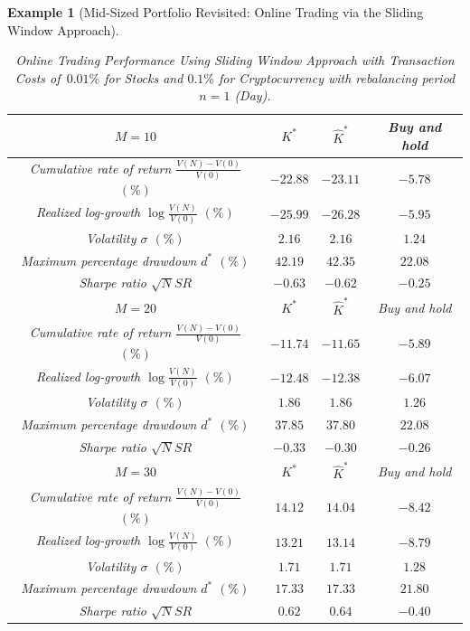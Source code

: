 \documentclass[10pt]{article} %
\newtheorem{example}{Example}[section]
\begin{document}
\begin{example}[Mid-Sized Portfolio Revisited: Online Trading via the Sliding Window Approach]
		\begin{table}[h!] 
			\centering
			\caption{Online Trading Performance Using Sliding Window Approach with Transaction Costs of~$0.01\%$ for Stocks and $0.1\%$ for Cryptocurrency with rebalancing period $n=1$ (Day).} 
			\begin{tabular}{|c|c|c|c|}
				\hline
				$M=10$ & $K^*$ & $\widehat{K}^*$ & Buy and hold \\
				\hline
				Cumulative rate of return $\frac{V(N)-V(0)}{V(0)}$ $(\%)$ & $-22.88$ & $-23.11$ & $-5.78$ \\
				\hline
				Realized log-growth $\log\frac{V(N)}{V(0)}$ $(\%)$ & $-25.99$ & $-26.28$ & $-5.95$\\
				\hline
				Volatility $\sigma$ $(\%)$ & $2.16 $& $2.16$ & $1.24$\\
				\hline
				Maximum percentage drawdown $d^*$ $(\%)$ & $42.19$ & $42.35$ & $22.08$\\
				\hline
				Sharpe ratio $\sqrt{N}SR$ &  $-0.63$ &  $-0.62$ & $-0.25$\\
				\hline
				\hline
				\hline
				$M=20$ & $K^*$ & $\widehat{K}^*$ & Buy and hold \\
				\hline
				Cumulative rate of return $\frac{V(N)-V(0)}{V(0)}$ $(\%)$ & $-11.74$ & $-11.65$ & $-5.89$ \\
				\hline
				Realized log-growth $\log\frac{V(N)}{V(0)}$ $(\%)$ & $-12.48$ & $-12.38$ & $-6.07$\\
				\hline
				Volatility $\sigma$ $(\%)$ & $1.86$ & $1.86$ & $1.26$\\
				\hline
				Maximum percentage drawdown $d^*$ $(\%)$ & $37.85$ & $37.80$ & $22.08$\\
				\hline
				Sharpe ratio $\sqrt{N}SR$ & $ -0.33$ & $-0.30$ &  $-0.26$ \\
				\hline
				\hline
				\hline
				$M=30$ & $K^*$ & $\widehat{K}^*$ & Buy and hold \\
				\hline
				Cumulative rate of return $\frac{V(N)-V(0)}{V(0)}$ $(\%)$ & $14.12$ & $14.04$ & $-8.42$ \\
				\hline
				Realized log-growth $\log\frac{V(N)}{V(0)}$ $(\%)$ & $13.21$ & $13.14$ & $-8.79$\\
				\hline
				Volatility $\sigma$ $(\%)$ & $1.71$ & $1.71$ & $1.28$\\
				\hline
				Maximum percentage drawdown $d^*$ $(\%)$ & $17.33$ & $17.33$ & $21.80$\\
				\hline
				Sharpe ratio $\sqrt{N}SR$ &  $0.62$ &  $0.64$ &  $-0.40$ \\
				\hline
			\end{tabular}
			\label{table: Descriptive Statistics Daily cost sliding window 0.01 (n=1)}
		\end{table}
		

\end{example}
\end{document}

